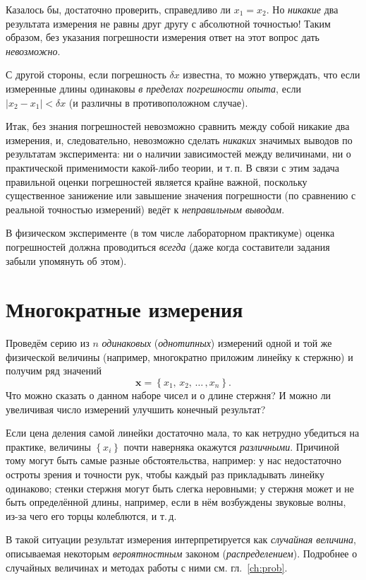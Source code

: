 Казалось бы,
достаточно проверить, справедливо ли $x_{1}=x_{2}$. Но \emph{никакие}
два результата измерения не равны друг другу с абсолютной точностью! Таким
образом, без указания погрешности измерения ответ на этот вопрос дать
\emph{невозможно}.

С другой стороны, если погрешность $\delta x$ известна, то можно
утверждать, что если измеренные длины одинаковы
\emph{в пределах погрешности опыта}, если $|x_{2}-x_{1}|<\delta x$
(и различны в противоположном случае).

Итак, без знания погрешностей невозможно сравнить между собой никакие
два измерения, и, следовательно, невозможно сделать \emph{никаких}
значимых выводов по результатам эксперимента: ни о наличии зависимостей
между величинами, ни о практической применимости какой-либо теории,
и т.\,п. В связи с этим задача правильной оценки погрешностей является крайне
важной, поскольку существенное занижение или завышение значения погрешности
(по сравнению с реальной точностью измерений) ведёт к \emph{неправильным выводам}.

В физическом эксперименте (в том числе лабораторном практикуме) оценка
погрешностей должна проводиться \emph{всегда}
(даже когда составители задания забыли упомянуть об этом).

\section{Многократные измерения}

Проведём серию из $n$ \emph{одинаковых} (\emph{однотипных}) измерений одной
и той же физической величины (например, многократно приложим линейку к стержню) и получим
ряд значений
\[
\mathbf{x} = \left\{ x_{1},\,x_{2},\,\ldots\,,x_{n}\right\} .
\]
Что можно сказать о данном наборе чисел и о длине стержня?
И можно ли увеличивая число измерений улучшить конечный результат?

Если цена деления самой линейки достаточно мала, то как нетрудно убедиться
на практике, величины $\left\{ x_{i}\right\}$ почти наверняка окажутся
\emph{различными}. Причиной тому могут быть
самые разные обстоятельства, например: у нас недостаточно остроты
зрения и точности рук, чтобы каждый раз прикладывать линейку одинаково;
стенки стержня могут быть слегка неровными; у стержня может и не быть
определённой длины, например, если в нём возбуждены звуковые волны,
из-за чего его торцы колеблются, и т.\,д.

В такой ситуации результат измерения интерпретируется как
\emph{случайная величина}, описываемая некоторым \emph{вероятностным} законом
(\emph{распределением}).
Подробнее о случайных величинах и методах работы с ними см. гл.~\ref{ch:prob}.

